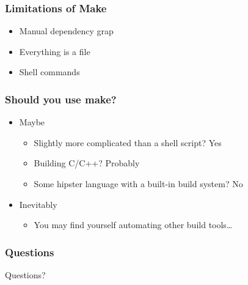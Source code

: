 \documentclass[xcolor=dvipsnames,t,compress]{beamer}
\begin{document}
\begin{frame}
\frametitle{Limitations of Make}
\begin{itemize}[<+->]
\item Manual dependency grap
\item Everything is a file
\item Shell commands
\end{itemize}
\end{frame}

\begin{frame}
\frametitle{Should you use make?}
\begin{itemize}[<+->]
\item Maybe
\begin{itemize}
\item Slightly more complicated than a shell script? Yes
\item Building C/C++? Probably
\item Some hipster language with a built-in build system? No
\end{itemize}
\item Inevitably
\begin{itemize}
\item You may find yourself automating other build tools\ldots
\end{itemize}
\end{itemize}
\end{frame}

\begin{frame}
\frametitle{Questions}
\begin{center}
\Huge Questions?
\end{center}
\end{frame}
\end{document}
